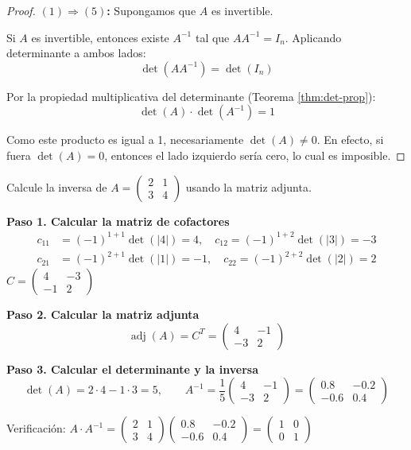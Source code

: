 \begin{theorem}
\begin{proof}
\textbf{$(1) \Rightarrow (5)$:} Supongamos que $A$ es invertible.

Si $A$ es invertible, entonces existe $A^{-1}$ tal que $AA^{-1} = I_n$. Aplicando determinante a ambos lados:
\[\det(AA^{-1}) = \det(I_n)\]

Por la propiedad multiplicativa del determinante (Teorema \ref{thm:det-prop}):
\[\det(A) \cdot \det(A^{-1}) = 1\]

Como este producto es igual a 1, necesariamente $\det(A) \neq 0$. En efecto, si fuera $\det(A) = 0$, entonces el lado izquierdo sería cero, lo cual es imposible.
\end{proof}
\end{theorem}



\begin{example}
Calcule la inversa de $A = \begin{pmatrix} 2 & 1 \\ 3 & 4 \end{pmatrix}$ usando la matriz adjunta.
\begin{myproof}
\textbf{Paso 1. Calcular la matriz de cofactores}
\begin{align*}
c_{11} &= (-1)^{1+1} \det(|4|) = 4, \quad c_{12} = (-1)^{1+2} \det(|3|) = -3 \\
c_{21} &= (-1)^{2+1} \det(|1|) = -1, \quad c_{22} = (-1)^{2+2} \det(|2|) = 2
\end{align*}
$C = \begin{pmatrix} 4 & -3 \\ -1 & 2 \end{pmatrix}$

\textbf{Paso 2. Calcular la matriz adjunta}
\[
\operatorname{adj}(A) = C^T = \begin{pmatrix} 4 & -1 \\ -3 & 2 \end{pmatrix}
\]

\textbf{Paso 3. Calcular el determinante y la inversa}
\[
\det(A) = 2\cdot4 - 1\cdot3 = 5, \qquad \boxed{A^{-1} = \frac{1}{5} \begin{pmatrix} 4 & -1 \\ -3 & 2 \end{pmatrix} = \begin{pmatrix} 0.8 & -0.2 \\ -0.6 & 0.4 \end{pmatrix}}
\]

Verificación: $A \cdot A^{-1} = \begin{pmatrix} 2 & 1 \\ 3 & 4 \end{pmatrix} \begin{pmatrix} 0.8 & -0.2 \\ -0.6 & 0.4 \end{pmatrix} = \begin{pmatrix} 1 & 0 \\ 0 & 1 \end{pmatrix}$ \checkmark
\end{myproof}
\end{example}

